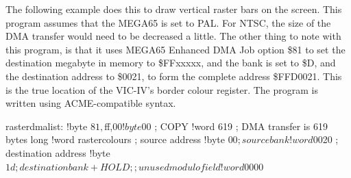 The following example does this to draw vertical raster bars on the screen.
This program assumes that the MEGA65 is set to PAL.  For NTSC, the size of the DMA transfer
would need to be decreased a little.  The other thing to note with this program, is that
it uses MEGA65 Enhanced DMA Job option \$81 to set the destination megabyte in memory to
\$FFxxxxx, and the bank is set to \$D, and the destination address to \$0021, to form the
complete address \$FFD0021.  This is the true location of the VIC-IV's border colour register.
The program is written using ACME-compatible syntax.


\begin{screencode}
rasterdmalist:
	!byte $81,$ff,$00
	!byte $00 		; COPY
	!word 619 		; DMA transfer is 619 bytes long
	!word rastercolours	; source address
	!byte $00               ; source bank
	!word $0020		; destination address
	!byte $1d               ; destination bank + HOLD
	;; unused modulo field
	!word $0000
\end{screencode}

